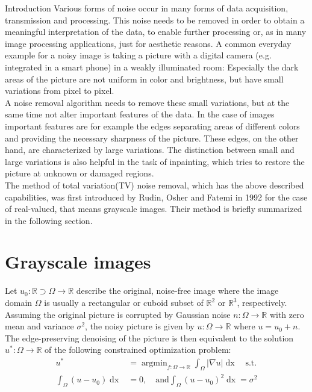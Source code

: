 \begin{chapter}{Introduction}
\label{ch:introduction}
Various forms of noise occur in many forms of data acquisition, transmission and processing.
This noise needs to be removed in order to obtain a meaningful interpretation of the data, to enable further processing or, as in many image processing 
applications, just for aesthetic reasons. A common everyday example for a noisy image is taking a picture with a digital camera (e.g. integrated in a smart phone) in a weakly illuminated room:
Especially the dark areas of the picture are not uniform in color and brightness, but have small variations from pixel to pixel.\\

A noise removal algorithm needs to remove these small variations, but at the same time not alter important features of the data. In the case of images important features are for example 
the edges separating areas of different colors and providing the necessary sharpness of the picture. These edges, on the other hand, are characterized by large variations. The distinction
between small and large variations is also helpful in the task of inpainting, which tries to restore the picture at unknown or damaged regions.\\

The method of total variation(TV) noise removal, which has the above described capabilities, was first introduced by Rudin, Osher and Fatemi \cite{RudinOsher} in 1992
for the case of real-valued, that means grayscale images. Their method is briefly summarized in the following section.

\section{Grayscale images}
Let $u_0:  \mathbb{R}\supset\Omega\to \mathbb{R}$ describe the original, noise-free image where the image domain $\Omega$ is usually a rectangular or cuboid subset of $\mathbb{R}^2$ or $\mathbb{R}^3$, respectively. 
Assuming the original picture is corrupted by Gaussian noise $n: \Omega\to\mathbb{R}$ with zero mean and variance $\sigma^2$, the noisy picture is given by $u: \Omega\to \mathbb{R}$ where
$u = u_0 + n$. The edge-preserving denoising of the picture is then equivalent to the solution $u^* :\Omega\to \mathbb{R}$ of the following constrained optimization problem:
\begin{align}
    \label{osher_opt}
    u^* &= \operatorname{argmin}_{f: \Omega\to \mathbb{R}}\int_\Omega\left\vert\nabla u\right\vert \mathop{dx} \quad\text{s.t.}\\
    \int_\Omega(u-u_0)\mathop{dx} &= 0, \quad\text{and} \int_\Omega(u-u_0)^2 \mathop{dx}= \sigma^2
\end{align}


\end{chapter}
